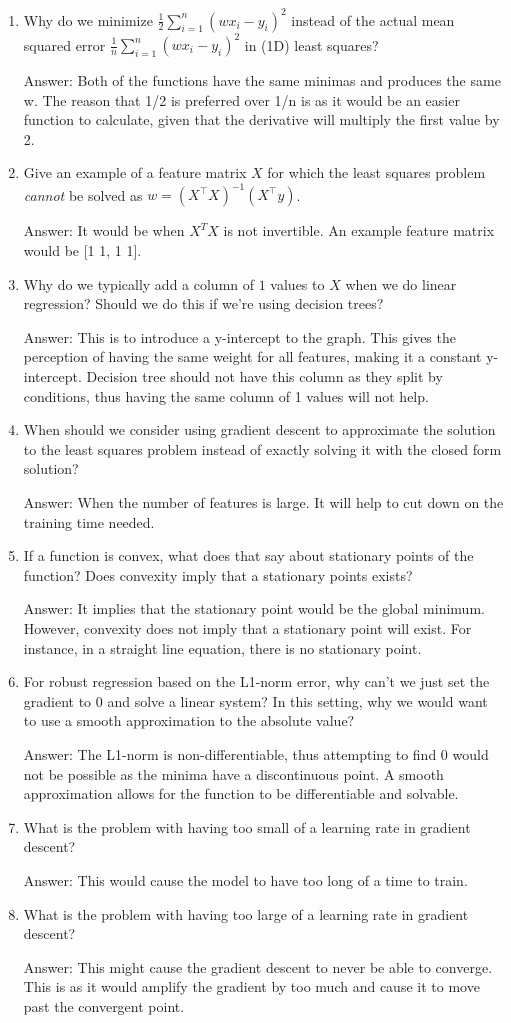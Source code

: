 \documentclass{article}
\def\ans#1{\par\gre{Answer: #1}}
\def\gre#1{{\color{gre}#1}}
\begin{document}
\begin{enumerate}
\begin{itemize}
\end{itemize}
\item Why do we minimize $\frac{1}{2}\sum_{i=1} ^n (wx_i-y_i)^2$ instead of the actual mean squared error $\frac{1}{n}\sum_{i=1}^n (wx_i-y_i)^2$ in (1D) least squares?
\ans{Both of the functions have the same minimas and produces the same w. The reason that 1/2 is preferred over 1/n is as it would be an easier function to calculate, given that the derivative will multiply the first value by 2.}
\item Give an example of a feature matrix $X$ for which the least squares problem \emph{cannot} be solved as $w = (X^\top X)^{-1}(X^\top y)$.
\ans{It would be when $X^T X$ is not invertible. An example feature matrix would be [1 1, 1 1].}
\item Why do we typically add a column of $1$ values to $X$ when we do linear regression? Should we do this if we're using decision trees?
\ans{This is to introduce a y-intercept to the graph. This gives the perception of having the same weight for all features, making it a constant y-intercept. Decision tree should not have this column as they split by conditions, thus having the same column of 1 values will not help.}
\item When should we consider using gradient descent to approximate the solution to the least squares problem instead of exactly solving it with the closed form solution?
\ans{When the number of features is large. It will help to cut down on the training time needed.}
\item If a function is convex, what does that say about stationary points of the function? Does convexity imply that a stationary points exists?
\ans{It implies that the stationary point would be the global minimum. However, convexity does not imply that a stationary point will exist. For instance, in a straight line equation, there is no stationary point.}
\item For robust regression based on the L1-norm error, why can't we just set the gradient to 0 and solve a linear system? In this setting, why we would want to use a smooth approximation to the absolute value?
\ans{The L1-norm is non-differentiable, thus attempting to find 0 would not be possible as the minima have a discontinuous point. A smooth approximation allows for the function to be differentiable and solvable.}
\item What is the problem with having too small of a learning rate in gradient descent?
\ans{This would cause the model to have too long of a time to train.}
\item What is the problem with having too large of a learning rate in gradient descent?
\ans{This might cause the gradient descent to never be able to converge. This is as it would amplify the gradient by too much and cause it to move past the convergent point.}
\end{enumerate}
\end{document}
